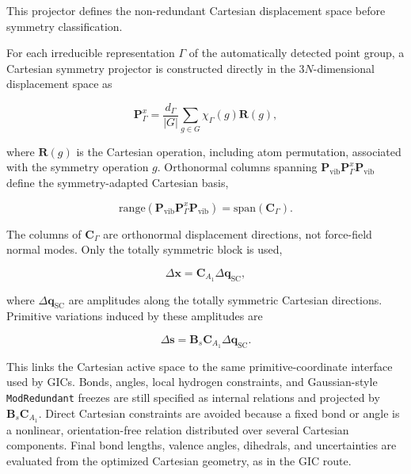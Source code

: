 \documentclass[journal=jctcce,manuscript=article,maxauthors=999]{achemso}
\begin{document}
This projector defines the non-redundant Cartesian displacement space before
symmetry classification.

For each irreducible representation $\Gamma$ of the automatically detected
point group, a Cartesian symmetry projector is constructed directly in the
$3N$-dimensional displacement space as

\begin{equation}
\mathbf{P}^{x}_{\Gamma}
=
\frac{d_{\Gamma}}{|G|}
\sum_{g\in G}
\chi_{\Gamma}(g)
\mathbf{R}(g),
\end{equation}

where $\mathbf{R}(g)$ is the Cartesian operation, including atom permutation,
associated with the symmetry operation $g$. Orthonormal columns spanning
$\mathbf{P}_{\mathrm{vib}}\mathbf{P}^{x}_{\Gamma}\mathbf{P}_{\mathrm{vib}}$
define the symmetry-adapted Cartesian basis,

\begin{equation}
\mathrm{range}
\left(
\mathbf{P}_{\mathrm{vib}}
\mathbf{P}^{x}_{\Gamma}
\mathbf{P}_{\mathrm{vib}}
\right)
=
\mathrm{span}
\left(
\mathbf{C}_{\Gamma}
\right).
\end{equation}

The columns of $\mathbf{C}_{\Gamma}$ are orthonormal displacement directions,
not force-field normal modes. Only the totally symmetric block is used,

\begin{equation}
\Delta \mathbf{x} =
\mathbf{C}_{A_1}
\Delta \mathbf{q}_{\mathrm{SC}},
\end{equation}

where $\Delta \mathbf{q}_{\mathrm{SC}}$ are amplitudes along the totally
symmetric Cartesian directions. Primitive variations induced by these
amplitudes are

\begin{equation}
\Delta \mathbf{s}
=
\mathbf{B}_s
\mathbf{C}_{A_1}
\Delta \mathbf{q}_{\mathrm{SC}} .
\end{equation}

This links the Cartesian active space to the same primitive-coordinate
interface used by GICs. Bonds, angles, local hydrogen constraints, and
Gaussian-style \texttt{ModRedundant} freezes are still specified as internal
relations and projected by $\mathbf{B}_s\mathbf{C}_{A_1}$. Direct Cartesian
constraints are avoided because a fixed bond or angle is a nonlinear,
orientation-free relation distributed over several Cartesian components. Final
bond lengths, valence angles, dihedrals, and uncertainties are evaluated from
the optimized Cartesian geometry, as in the GIC route.
\end{document}
